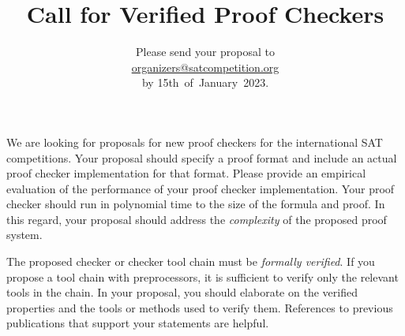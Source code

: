 \documentclass{article}
\title{Call for Verified Proof Checkers}
\author{Please send your proposal to\\[.3em] \mbox{\url{organizers@satcompetition.org}}\\[.3em] by 15th~of~January~2023.}
\date{}
\begin{document}
\maketitle
\thispagestyle{empty}

We are looking for proposals for new proof checkers for the international SAT competitions. 
Your proposal should specify a proof format and include an actual proof checker implementation for that format.
Please provide an empirical evaluation of the performance of your proof checker implementation.
Your proof checker should run in polynomial time to the size of the formula and proof. 
In this regard, your proposal should address the \emph{complexity} of the proposed proof system. 

The proposed checker or checker tool chain must be \emph{formally verified}. 
If you propose a tool chain with preprocessors, it is sufficient to verify only the relevant tools in the chain. 
In your proposal, you should elaborate on the verified properties and the tools or methods used to verify them.
References to previous publications that support your statements are helpful.





%
\end{document}
